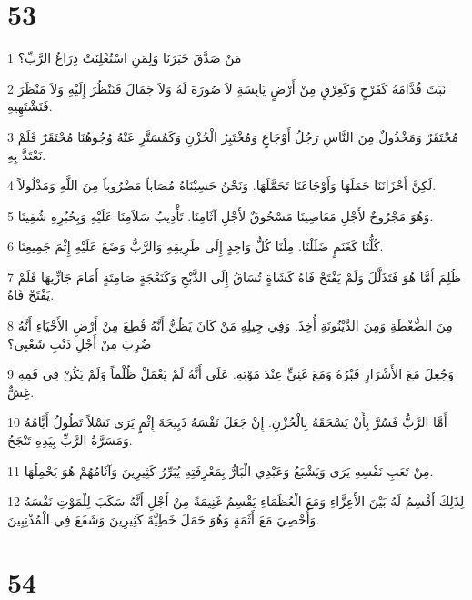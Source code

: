 \chapter{53}

\par 1 مَنْ صَدَّقَ خَبَرَنَا وَلِمَنِ اسْتُعْلِنَتْ ذِرَاعُ الرَّبِّ؟
\par 2 نَبَتَ قُدَّامَهُ كَفَرْخٍ وَكَعِرْقٍ مِنْ أَرْضٍ يَابِسَةٍ لاَ صُورَةَ لَهُ وَلاَ جَمَالَ فَنَنْظُرَ إِلَيْهِ وَلاَ مَنْظَرَ فَنَشْتَهِيهِ.
\par 3 مُحْتَقَرٌ وَمَخْذُولٌ مِنَ النَّاسِ رَجُلُ أَوْجَاعٍ وَمُخْتَبِرُ الْحُزْنِ وَكَمُسَتَّرٍ عَنْهُ وُجُوهُنَا مُحْتَقَرٌ فَلَمْ نَعْتَدَّ بِهِ.
\par 4 لَكِنَّ أَحْزَانَنَا حَمَلَهَا وَأَوْجَاعَنَا تَحَمَّلَهَا. وَنَحْنُ حَسِبْنَاهُ مُصَاباً مَضْرُوباً مِنَ اللَّهِ وَمَذْلُولاً.
\par 5 وَهُوَ مَجْرُوحٌ لأَجْلِ مَعَاصِينَا مَسْحُوقٌ لأَجْلِ آثَامِنَا. تَأْدِيبُ سَلاَمِنَا عَلَيْهِ وَبِحُبُرِهِ شُفِينَا.
\par 6 كُلُّنَا كَغَنَمٍ ضَلَلْنَا. مِلْنَا كُلُّ وَاحِدٍ إِلَى طَرِيقِهِ وَالرَّبُّ وَضَعَ عَلَيْهِ إِثْمَ جَمِيعِنَا.
\par 7 ظُلِمَ أَمَّا هُوَ فَتَذَلَّلَ وَلَمْ يَفْتَحْ فَاهُ كَشَاةٍ تُسَاقُ إِلَى الذَّبْحِ وَكَنَعْجَةٍ صَامِتَةٍ أَمَامَ جَازِّيهَا فَلَمْ يَفْتَحْ فَاهُ.
\par 8 مِنَ الضُّغْطَةِ وَمِنَ الدَّيْنُونَةِ أُخِذَ. وَفِي جِيلِهِ مَنْ كَانَ يَظُنُّ أَنَّهُ قُطِعَ مِنْ أَرْضِ الأَحْيَاءِ أَنَّهُ ضُرِبَ مِنْ أَجْلِ ذَنْبِ شَعْبِي؟
\par 9 وَجُعِلَ مَعَ الأَشْرَارِ قَبْرُهُ وَمَعَ غَنِيٍّ عِنْدَ مَوْتِهِ. عَلَى أَنَّهُ لَمْ يَعْمَلْ ظُلْماً وَلَمْ يَكُنْ فِي فَمِهِ غِشٌّ.
\par 10 أَمَّا الرَّبُّ فَسُرَّ بِأَنْ يَسْحَقَهُ بِالْحُزْنِ. إِنْ جَعَلَ نَفْسَهُ ذَبِيحَةَ إِثْمٍ يَرَى نَسْلاً تَطُولُ أَيَّامُهُ وَمَسَرَّةُ الرَّبِّ بِيَدِهِ تَنْجَحُ.
\par 11 مِنْ تَعَبِ نَفْسِهِ يَرَى وَيَشْبَعُ وَعَبْدِي الْبَارُّ بِمَعْرِفَتِهِ يُبَرِّرُ كَثِيرِينَ وَآثَامُهُمْ هُوَ يَحْمِلُهَا.
\par 12 لِذَلِكَ أَقْسِمُ لَهُ بَيْنَ الأَعِزَّاءِ وَمَعَ الْعُظَمَاءِ يَقْسِمُ غَنِيمَةً مِنْ أَجْلِ أَنَّهُ سَكَبَ لِلْمَوْتِ نَفْسَهُ وَأُحْصِيَ مَعَ أَثَمَةٍ وَهُوَ حَمَلَ خَطِيَّةَ كَثِيرِينَ وَشَفَعَ فِي الْمُذْنِبِينَ.

\chapter{54}

